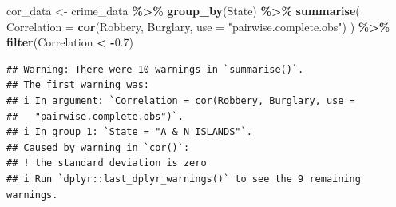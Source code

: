 \documentclass[
]{article}
\newenvironment{Shaded}{\begin{snugshade}}{\end{snugshade}}
\newcommand{\AttributeTok}[1]{\textcolor[rgb]{0.13,0.29,0.53}{#1}}
\newcommand{\FloatTok}[1]{\textcolor[rgb]{0.00,0.00,0.81}{#1}}
\newcommand{\FunctionTok}[1]{\textcolor[rgb]{0.13,0.29,0.53}{\textbf{#1}}}
\newcommand{\NormalTok}[1]{#1}
\newcommand{\OtherTok}[1]{\textcolor[rgb]{0.56,0.35,0.01}{#1}}
\newcommand{\SpecialCharTok}[1]{\textcolor[rgb]{0.81,0.36,0.00}{\textbf{#1}}}
\newcommand{\StringTok}[1]{\textcolor[rgb]{0.31,0.60,0.02}{#1}}
\begin{document}
\begin{Shaded}
\begin{Highlighting}[]
\NormalTok{cor\_data }\OtherTok{\textless{}{-}}\NormalTok{ crime\_data }\SpecialCharTok{\%\textgreater{}\%}
  \FunctionTok{group\_by}\NormalTok{(State) }\SpecialCharTok{\%\textgreater{}\%}
  \FunctionTok{summarise}\NormalTok{(}
    \AttributeTok{Correlation =} \FunctionTok{cor}\NormalTok{(Robbery, Burglary, }\AttributeTok{use =} \StringTok{"pairwise.complete.obs"}\NormalTok{)}
\NormalTok{  ) }\SpecialCharTok{\%\textgreater{}\%}
  \FunctionTok{filter}\NormalTok{(Correlation }\SpecialCharTok{\textless{}} \SpecialCharTok{{-}}\FloatTok{0.7}\NormalTok{)}
\end{Highlighting}
\end{Shaded}

\begin{verbatim}
## Warning: There were 10 warnings in `summarise()`.
## The first warning was:
## i In argument: `Correlation = cor(Robbery, Burglary, use =
##   "pairwise.complete.obs")`.
## i In group 1: `State = "A & N ISLANDS"`.
## Caused by warning in `cor()`:
## ! the standard deviation is zero
## i Run `dplyr::last_dplyr_warnings()` to see the 9 remaining warnings.
\end{verbatim}
\end{document}
